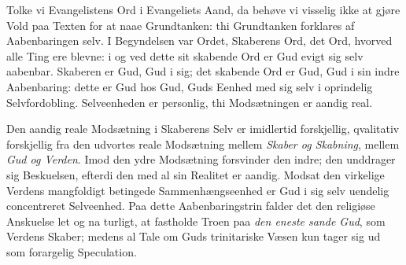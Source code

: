 \documentclass[12pt]{book}
\begin{document}
Tolke vi Evangelistens Ord i Evangeliets Aand, da behøve vi visselig
ikke at gjøre Vold paa Texten for at naae Grundtanken: thi
Grundtanken forklares af Aabenbaringen selv. I Begyndelsen var
Ordet, Skaberens Ord, det Ord, hvorved alle Ting ere blevne: i og
ved dette sit skabende Ord er Gud evigt sig selv aabenbar. Skaberen
er Gud, Gud i sig; det skabende Ord er Gud, Gud i sin indre
Aabenbaring: dette er Gud hos Gud, Guds Eenhed med sig selv i
oprindelig Selvfordobling. Selveenheden er personlig, thi
Modsætningen er aandig real.

Den aandig reale Modsætning i Skaberens Selv er imidlertid
forskjellig, qvalitativ forskjellig fra den udvortes reale
Modsætning mellem \emph{Skaber og Skabning}, mellem \emph{Gud og
Verden}. Imod den ydre Modsætning forsvinder den indre; den
unddrager sig Beskuelsen, efterdi den med al sin Realitet er aandig.
Modsat den virkelige Verdens mangfoldigt betingede
Sammenhængseenhed er Gud i sig selv uendelig concentreret
Selveenhed. Paa dette Aabenbaringstrin falder det den religiøse
Anskuelse let og na\-
turligt, at fastholde Troen paa \emph{den eneste sande Gud}, som
Verdens Skaber; medens al Tale om Guds trinitariske Væsen kun tager
sig ud som forargelig Speculation.
\end{document}
